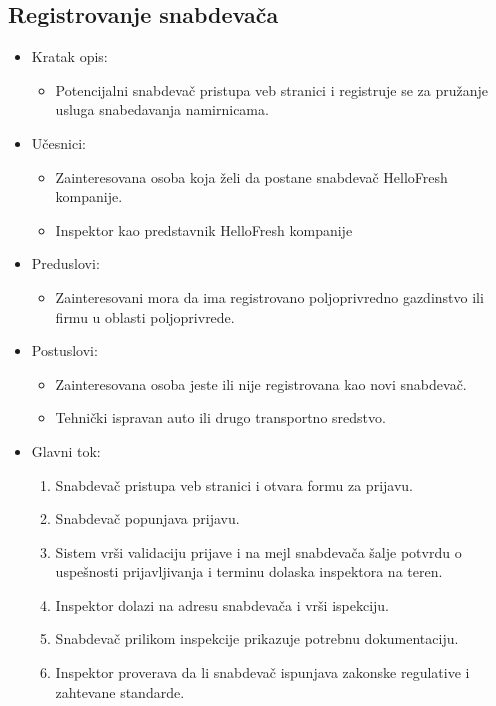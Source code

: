 \subsection{Registrovanje snabdevača}

\begin{itemize}
	\item Kratak opis:
		\begin{itemize}
			\item Potencijalni snabdevač pristupa veb stranici i registruje se za pružanje usluga snabedavanja namirnicama.
		\end{itemize}
	\item Učesnici:
		\begin{itemize}
			\item Zainteresovana osoba koja želi da postane snabdevač HelloFresh kompanije.
			\item Inspektor kao predstavnik HelloFresh kompanije
		\end{itemize}				
	\item Preduslovi:
		\begin{itemize}
		    \item Zainteresovani mora da ima registrovano poljoprivredno gazdinstvo ili firmu u oblasti poljoprivrede.
		\end{itemize}
	\item Postuslovi:
		\begin{itemize}
			\item Zainteresovana osoba jeste ili nije registrovana kao novi snabdevač.
			\item Tehnički ispravan auto ili drugo transportno sredstvo.
		\end{itemize}		
	\item Glavni tok:
		\begin{enumerate}
		    \item Snabdevač pristupa veb stranici i otvara formu za prijavu.
		    \item Snabdevač popunjava prijavu.
		    \item Sistem vrši validaciju prijave i na mejl snabdevača šalje potvrdu o uspešnosti prijavljivanja i terminu dolaska inspektora na teren. 
		    \item Inspektor dolazi na adresu snabdevača i vrši ispekciju.
		    \item Snabdevač prilikom inspekcije prikazuje potrebnu dokumentaciju.
		    \item Inspektor proverava da li snabdevač ispunjava zakonske regulative i zahtevane standarde.

\end{enumerate}
\end{itemize}
